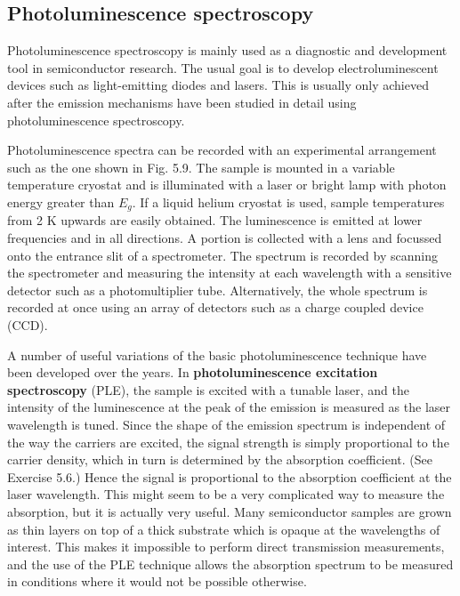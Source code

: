 \documentclass[12pt]{book}
\begin{document}
\subsection{Photoluminescence spectroscopy}
Photoluminescence spectroscopy is mainly used as a diagnostic and development tool in semiconductor research. The usual goal is to develop electroluminescent devices such as light-emitting diodes and lasers. This is usually only achieved after the emission mechanisms have been studied in detail using photoluminescence spectroscopy.

Photoluminescence spectra can be recorded with an experimental arrangement such as the one shown in Fig. 5.9. The sample is mounted in a variable temperature cryostat and is illuminated with a laser or bright lamp with photon energy greater than $E_g$. If a liquid helium cryostat is used, sample temperatures from 2 K upwards are easily obtained. The luminescence is emitted at lower frequencies and in all directions. A portion is collected with a lens and focussed onto the entrance slit of a spectrometer. The spectrum is recorded by scanning the spectrometer and measuring the intensity at each wavelength with a sensitive detector such as a photomultiplier tube. Alternatively, the whole spectrum is recorded at once using an array of detectors such as a charge coupled device (CCD).

A number of useful variations of the basic photoluminescence technique have been developed over the years. In \textbf{photoluminescence excitation spectroscopy} (PLE), the sample is excited with a tunable laser, and the intensity of the luminescence at the peak of the emission is measured as the laser wavelength is tuned. Since the shape of the emission spectrum is independent of the way the carriers are excited, the signal strength is simply proportional to the carrier density, which in turn is determined by the absorption coefficient. (See Exercise 5.6.) Hence the signal is proportional to the absorption coefficient at the laser wavelength. This might seem to be a very complicated way to measure the absorption, but it is actually very useful. Many semiconductor samples are grown as thin layers on top of a thick substrate which is opaque at the wavelengths of interest. This makes it impossible to perform direct transmission measurements, and the use of the PLE technique allows the absorption spectrum to be measured in conditions where it would not be possible otherwise.
\end{document}
